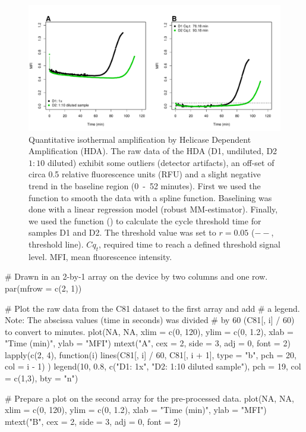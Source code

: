 \begin{figure}[htbp]
  \centering
  \includegraphics[clip=true, width=14.5cm]{figures/qIA.pdf}
  \caption{Quantitative isothermal amplification by Helicase Dependent 
Amplification (HDA).  The raw data of the HDA (D1, undiluted, D2 
$1:10$ diluted) exhibit some outliers (detector artifacts), an off-set of circa 
0.5 relative fluorescence units (RFU) and a slight negative trend in the 
baseline region (0~-~52 minutes).  First we used the  
function to smooth the data with a spline function. Baselining was done with a 
linear regression model (robust MM-estimator). Finally, we used the 
 function () to calculate the cycle threshold time 
for samples D1 and D2. The threshold value was set to $r = 0.05$ ($--$, 
threshold line). $Cq_{t}$, required time to reach a defined threshold signal 
level. MFI, mean fluorescence intensity.}
  \label{figure:qIA}
\end{figure}

\begin{example}
# Drawn in an 2-by-1 array on the device by two columns and one row.
par(mfrow = c(2, 1))

# Plot the raw data from the C81 dataset to the first array and add
# a legend. Note: The abscissa values (time in seconds) was divided 
# by 60 (C81[, i] / 60) to convert to minutes.
plot(NA, NA, xlim = c(0, 120), ylim = c(0, 1.2), xlab = "Time (min)", ylab = "MFI")
mtext("A", cex = 2, side = 3, adj = 0, font = 2)
lapply(c(2, 4), function(i) {
  lines(C81[, i] / 60, C81[, i + 1], type = "b", pch = 20, col = i - 1)
})
legend(10, 0.8, c("D1: 1x", "D2: 1:10 diluted sample"), pch = 19, col = c(1,3), bty = "n")

# Prepare a plot on the second array for the pre-processed data.
plot(NA, NA, xlim = c(0, 120), ylim = c(0, 1.2), xlab = "Time (min)", ylab = "MFI")
mtext("B", cex = 2, side = 3, adj = 0, font = 2)
\end{example}

